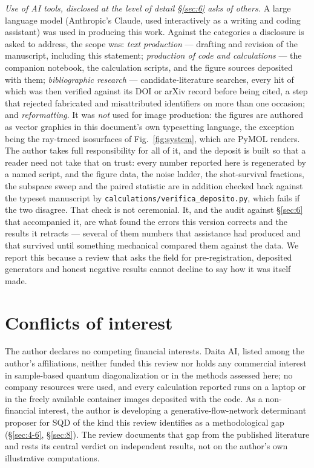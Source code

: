 \documentclass[onecolumn,a4paper]{quantumarticle}
\begin{document}
\emph{Use of AI tools, disclosed at the level of detail \S\ref{sec:6} asks of others.} A large language model (Anthropic's Claude, used interactively as a writing and coding assistant) was used in producing this work. Against the categories a disclosure is asked to address, the scope was: \emph{text production} --- drafting and revision of the manuscript, including this statement; \emph{production of code and calculations} --- the companion notebook, the calculation scripts, and the figure sources deposited with them; \emph{bibliographic research} --- candidate-literature searches, every hit of which was then verified against its DOI or arXiv record before being cited, a step that rejected fabricated and misattributed identifiers on more than one occasion; and \emph{reformatting}. It was \emph{not} used for image production: the figures are authored as vector graphics in this document's own typesetting language, the exception being the ray-traced isosurfaces of Fig.~\ref{fig:system}, which are PyMOL renders. The author takes full responsibility for all of it, and the deposit is built so that a reader need not take that on trust: every number reported here is regenerated by a named script, and the figure data, the noise ladder, the shot-survival fractions, the subspace sweep and the paired statistic are in addition checked back against the typeset manuscript by \texttt{calculations/verifica\_deposito.py}, which fails if the two disagree. That check is not ceremonial. It, and the audit against \S\ref{sec:6} that accompanied it, are what found the errors this version corrects and the results it retracts --- several of them numbers that assistance had produced and that survived until something mechanical compared them against the data. We report this because a review that asks the field for pre-registration, deposited generators and honest negative results cannot decline to say how it was itself made.

\section*{Conflicts of interest}
\small
The author declares no competing financial interests. Daita AI, listed among the author's affiliations, neither funded this review nor holds any commercial interest in sample-based quantum diagonalization or in the methods assessed here; no company resources were used, and every calculation reported runs on a laptop or in the freely available container images deposited with the code. As a non-financial interest, the author is developing a generative-flow-network determinant proposer for SQD of the kind this review identifies as a methodological gap (\S\ref{sec:4-6}, \S\ref{sec:8}). The review documents that gap from the published literature and rests its central verdict on independent results, not on the author's own illustrative computations.
\end{document}
